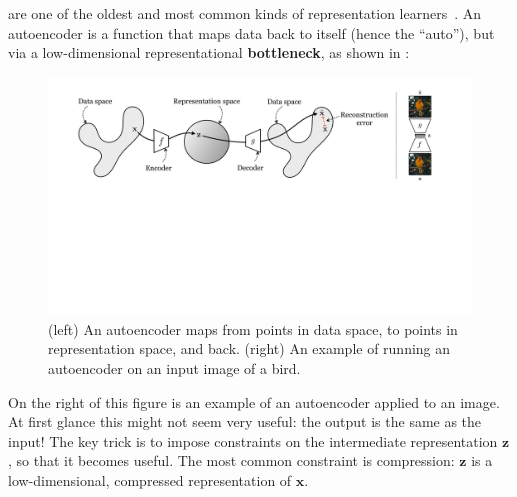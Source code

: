  are one of the oldest and most common kinds of representation learners~\cite{rumelhart1985learning, ballard1987modular}. An autoencoder is a function that maps data back to itself (hence the ``auto''), but via a low-dimensional representational \textbf{bottleneck}, as shown in \fig{\ref{fig:representation_learning:autoencoder_diagram}}:
\begin{figure}[h!]
    \centerline{
        \includegraphics[width=1.0\linewidth]{figures/representation_learning/autoencoder_diagram.pdf}
    }
  \caption{{\small (left) An autoencoder maps from points in data space, to points in representation space, and back. (right) An example of running an autoencoder on an input image of a bird.}}\label{fig:representation_learning:autoencoder_diagram}
\end{figure}

On the right of this figure is an example of an autoencoder applied to an image. At first glance this might not seem very useful: the output is the same as the input! The key trick is to impose constraints on the intermediate representation $\mathbf{z}$, so that it becomes useful. The most common constraint is compression: $\mathbf{z}$ is a low-dimensional, compressed representation of $\mathbf{x}$.

